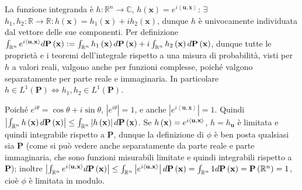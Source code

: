 \documentclass{article}
\begin{document}
La funzione integranda \`{e} $h:%
\mathbb{R}
^{n}\rightarrow 
\mathbb{C}
$, $h\left( \mathbf{x}\right) =e^{i\left\langle \mathbf{u},\mathbf{x}%
\right\rangle }$: $\exists $ $h_{1},h_{2}:%
\mathbb{R}
\rightarrow 
\mathbb{R}
:h\left( \mathbf{x}\right) =h_{1}\left( \mathbf{x}\right) +ih_{2}\left( 
\mathbf{x}\right) $, dunque $h$ \`{e} univocamente individuata dal vettore
delle sue componenti. Per definizione $\int_{%
\mathbb{R}
^{n}}e^{i\left\langle \mathbf{u},\mathbf{x}\right\rangle }d\mathbf{P}\left( 
\mathbf{x}\right) :=\int_{%
\mathbb{R}
^{n}}h_{1}\left( \mathbf{x}\right) d\mathbf{P}\left( \mathbf{x}\right)
+i\int_{%
\mathbb{R}
^{n}}h_{2}\left( \mathbf{x}\right) d\mathbf{P}\left( \mathbf{x}\right) $,
dunque tutte le propriet\`{a} e i teoremi dell'integrale rispetto a una
misura di probabilit\`{a}, visti per $h$ a valori reali, valgono anche per
funzioni complesse, poich\'{e} valgono separatamente per parte reale e
immaginaria. In particolare $h\in L^{1}\left( \mathbf{P}\right)
\Longleftrightarrow h_{1},h_{2}\in L^{1}\left( \mathbf{P}\right) $.

Poich\'{e} $e^{i\theta }=\cos \theta +i\sin \theta $, $\left\vert e^{i\theta
}\right\vert =1$, e anche $\left\vert e^{i\left\langle \mathbf{u,x}%
\right\rangle }\right\vert =1$. Quindi $\left\vert \int_{%
\mathbb{R}
^{n}}h\left( \mathbf{x}\right) d\mathbf{P}\left( \mathbf{x}\right)
\right\vert \leq \int_{%
\mathbb{R}
^{n}}\left\vert h\left( \mathbf{x}\right) \right\vert d\mathbf{P}\left( 
\mathbf{x}\right) $. Se $h\left( \mathbf{x}\right) =e^{i\left\langle \mathbf{%
u},\mathbf{x}\right\rangle }$, $h=h_{\mathbf{u}}$ \`{e} limitata e quindi
integrabile rispetto a $\mathbf{P}$, dunque la definizione di $\phi $ \`{e}
ben posta qualsiasi sia $\mathbf{P}$ (come si pu\`{o} vedere anche
separatamente da parte reale e parte immaginaria, che sono funzioni
misurabili limitate e quindi integrabili rispetto a $\mathbf{P}$); inoltre $%
\left\vert \int_{%
\mathbb{R}
^{n}}e^{i\left\langle \mathbf{u},\mathbf{x}\right\rangle }d\mathbf{P}\left( 
\mathbf{x}\right) \right\vert \leq \int_{%
\mathbb{R}
^{n}}\left\vert e^{i\left\langle \mathbf{u},\mathbf{x}\right\rangle
}\right\vert d\mathbf{P}\left( \mathbf{x}\right) =\int_{%
\mathbb{R}
^{n}}1d\mathbf{P}\left( \mathbf{x}\right) =\mathbf{P}\left( 
\mathbb{R}
^{n}\right) =1$, cio\`{e} $\phi $ \`{e} limitata in modulo.
\end{document}
